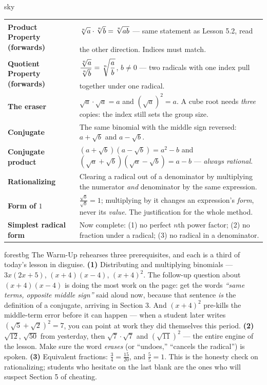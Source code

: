 \documentclass[10pt]{article}
\newcommand{\TallMath}[1]{$\displaystyle #1\rule[-1.4em]{0pt}{3.2em}$}
\begin{document}
\begin{skillbox}{sky}
\renewcommand{\arraystretch}{1.3}
\begin{tabularx}{\linewidth}{@{}l X@{}}
\textbf{Product Property (forwards)} & \TallMath{\sqrt[n]{a}\cdot\sqrt[n]{b}=\sqrt[n]{ab}} --- same statement as Lesson 5.2, read the other direction. Indices must match. \\
\textbf{Quotient Property (forwards)} & \TallMath{\dfrac{\sqrt[n]{a}}{\sqrt[n]{b}}=\sqrt[n]{\dfrac{a}{b}}}, $b\ne0$ --- two radicals with one index pull together under one radical. \\
\textbf{The eraser} & $\sqrt{a}\cdot\sqrt{a}=a$ and $\left(\sqrt a\right)^{2}=a$. A cube root needs \emph{three} copies: the index still sets the group size. \\
\textbf{Conjugate} & The same binomial with the middle sign reversed: $a+\sqrt b$ and $a-\sqrt b$. \\
\textbf{Conjugate product} & $\left(a+\sqrt b\right)\left(a-\sqrt b\right)=a^{2}-b$ and $\left(\sqrt a+\sqrt b\right)\left(\sqrt a-\sqrt b\right)=a-b$ --- \emph{always rational}. \\
\textbf{Rationalizing} & Clearing a radical out of a denominator by multiplying the numerator \emph{and} denominator by the same expression. \\
\textbf{Form of $1$} & $\frac{\sqrt b}{\sqrt b}=1$; multiplying by it changes an expression's \emph{form}, never its \emph{value}. The justification for the whole method. \\
\textbf{Simplest radical form} & Now complete: (1) no perfect $n$th power factor; (2) no fraction under a radical; (3) no radical in a denominator. \\
\end{tabularx}
\end{skillbox}

\begin{fixedskillbox}{forestbg}
    The Warm-Up rehearses three prerequisites, and each is a third of today's lesson in disguise.
    \textbf{(1)} Distributing and multiplying binomials --- $3x(2x+5)$, $(x+4)(x-4)$, $(x+4)^{2}$.
    The follow-up question about $(x+4)(x-4)$ is doing the most work on the page: get the words
    \emph{``same terms, opposite middle sign''} said aloud now, because that sentence \emph{is} the
    definition of a conjugate, arriving in Section 3. And $(x+4)^{2}$ pre-kills the middle-term
    error before it can happen --- when a student later writes
    $\left(\sqrt5+\sqrt2\right)^{2}=7$, you can point at work they did themselves this period.
    \textbf{(2)} $\sqrt{12}$, $\sqrt{50}$ from yesterday, then $\sqrt7\cdot\sqrt7$ and
    $\left(\sqrt{11}\right)^{2}$ --- the entire engine of the lesson. Make sure the word
    \emph{erases} (or ``undoes,'' ``cancels the radical'') is spoken. \textbf{(3)} Equivalent
    fractions: $\frac34=\frac{15}{20}$, and $\frac55=1$. This is the honesty check on rationalizing;
    students who hesitate on the last blank are the ones who will suspect Section 5 of cheating.
\end{fixedskillbox}
\end{document}
